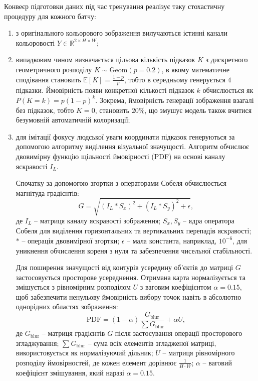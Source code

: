             Конвеєр підготовки даних під час тренування реалізує таку стохастичну процедуру для кожного батчу:
            \begin{enumerate}
                \item з оригінального кольорового зображення вилучаються істинні канали кольоровості $Y \in \mathbb{R}^{2 \times H \times W}$;
                \item випадковим чином визначається цільова кількість підказок $K$ з дискретного геометричного розподілу $K \sim \mathrm{Geom}(p=0.2)$,
                    в якому математичне сподівання становить $\mathbb{E}[K] = \frac{1 - p}{p}$, тобто в середньому генерується $4$ підказки.
                    Ймовірність появи конкретної кількості підказок $k$ обчислюється як $P(K=k) = p(1-p)^k$.
                    Зокрема, ймовірність генерації зображення взагалі без підказок, тобто $K=0$, становить $20\%$, що змушує модель також вчитися безумовній автоматичній колоризації;
                \item для імітації фокусу людської уваги координати підказок генеруються за допомогою алгоритму виділення візуальної значущості.
                    Алгоритм обчислює двовимірну функцію щільності ймовірності (PDF) на основі каналу яскравості $I_L$.

                    Спочатку за допомогою згортки з операторами Собеля обчислюється магнітуда градієнтів:
                    \begin{equation*}
                        G = \sqrt{(I_L * S_x)^2 + (I_L * S_y)^2 + \epsilon},
                    \end{equation*}
                    де $I_L$ -- матриця каналу яскравості зображення;
                    $S_x, S_y$ -- ядра оператора Собеля для виділення горизонтальних та вертикальних перепадів яскравості;
                    $*$ -- операція двовимірної згортки;
                    $\epsilon$ -- мала константа, наприклад, $10^{-6}$, для уникнення обчислення кореня з нуля та забезпечення чисельної стабільності.

                    Для поширення значущості від контурів усередину об'єктів до матриці $G$ застосовується просторове усереднення.
                    Отримана карта нормалізується та змішується з рівномірним розподілом $U$ з ваговим коефіцієнтом $\alpha = 0.15$,
                    щоб забезпечити ненульову ймовірність вибору точок навіть в абсолютно однорідних областях зображення:
                    \begin{equation*}
                        \mathrm{PDF} = (1 - \alpha) \frac{G_{\mathrm{blur}}}{\sum G_{\mathrm{blur}}} + \alpha U,
                    \end{equation*}
                    де $G_{\mathrm{blur}}$ -- матриця градієнтів $G$ після застосування операції просторового згладжування;
                    $\sum G_{\mathrm{blur}}$ -- сума всіх елементів згладженої матриці, використовується як нормалізуючий дільник;
                    $U$ -- матриця рівномірного розподілу ймовірностей, де кожен елемент дорівнює $\frac{1}{H \cdot W}$;
                    $\alpha$ -- ваговий коефіцієнт змішування, який наразі $\alpha = 0.15$.


\end{enumerate}
